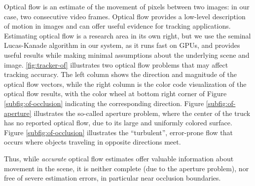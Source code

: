 Optical flow is an estimate of the movement of pixels between two images: in our case, two consecutive video frames. Optical flow provides a low-level description of motion in images and can offer useful evidence for tracking applications.
Estimating optical flow is a research area in its own right,
but we use the seminal Lucas-Kanade algorithm \cite{lucas1981iterative} in our system, as it runs fast on GPUs, and provides useful results while making minimal assumptions about the underlying scene and image. 
\ref{fig:tracker-of} illustrates two optical flow problems that may affect tracking accuracy. The left column shows the direction and magnitude of the optical flow vectors, while the right column is the color code visualization of the optical flow results, with the color wheel at bottom right corner of Figure \ref{subfig:of-occlusion} indicating the corresponding direction. %
Figure \ref{subfig:of-aperture} illustrates the so-called aperture problem, where the center of the truck has no reported optical flow, due to its large and uniformly colored surface. %
Figure \ref{subfig:of-occlusion} illustrates the ``turbulent'', error-prone flow that occurs where objects traveling in opposite directions meet.   %


Thus, while {\it accurate} optical flow estimates offer valuable information about movement in the scene, it is neither complete (due to the aperture problem), nor free of severe estimation errors, in particular near occlusion boundaries. 
